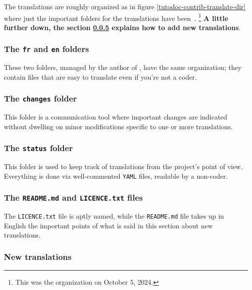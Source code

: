 The translations are roughly organized as in figure \ref{tutodoc-contrib-translate-dir} where just the important folders for the translations have been \,.%
\footnote{
    This was the organization on October 5, 2024.
}
\textbf{A little further down, the section \ref{tutodoc-contrib-translate} explains how to add new translations}.


\subsubsection{The \texttt{fr} and \texttt{en} folders}

These two folders, managed by the author of \thisproj, have the same organization; they contain files that are easy to translate even if you're not a coder.


\subsubsection{The \texttt{changes} folder}

This folder is a communication tool where important changes are indicated without dwelling on minor modifications specific to one or more translations.


\subsubsection{The \texttt{status} folder}

This folder is used to keep track of translations from the project's point of view. Everything is done via well-commented \verb#YAML# files, readable by a non-coder.


\subsubsection{The \texttt{README.md} and \texttt{LICENCE.txt} files}

The \texttt{LICENCE.txt} file is aptly named, while the \texttt{README.md} file takes up in English the important points of what is said in this section about new translations.


\subsubsection{New translations}
\label{tutodoc-contrib-translate}

